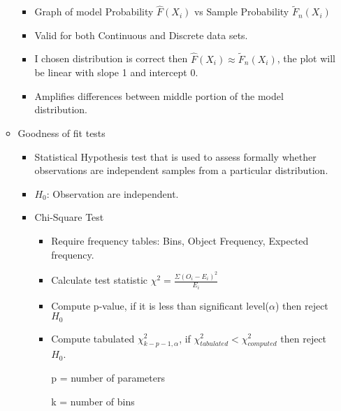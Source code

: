 \documentclass[a4paper]{article}
\begin{document}
\begin{enumerate}
\begin{itemize}
			\begin{itemize}
				\item Graph of model Probability $\hat{F}(X_{i})$ vs Sample Probability $\tilde{F}_{n}(X_{i})$
				\item Valid for both Continuous and Discrete data sets.
				\item I chosen distribution is correct then $\hat{F}(X_{i})\approx \tilde{F}_{n}(X_{i})$, the plot will be linear with slope 1 and intercept 0.
				\item Amplifies differences between middle portion of the model distribution.
			\end{itemize}
			\item Goodness of fit tests
			\begin{itemize}
				\item Statistical Hypothesis test that is used to assess formally whether observations are independent samples from a particular distribution.
				\item $H_{0}$: Observation are independent.
				\item Chi-Square Test
				\begin{itemize}
					\item Require frequency tables: Bins, Object Frequency, Expected frequency.
					\item Calculate test statistic $\chi^{2} = \frac{\Sigma(O_{i} - E_{i})^{2}}{E_{i}}$
					\item Compute p-value, if it is less than significant level($\alpha$) then reject $H_{0}$
					\item Compute tabulated $\chi^{2}_{k - p - 1, \alpha}$, if $\chi^{2}_{tabulated} < \chi^{2}_{computed}$ then reject $H_{0}$.
					
					p = number of parameters
					
					k = number of bins
				\end{itemize}
			\end{itemize}
		\end{itemize}
	\end{enumerate}
\end{document}
